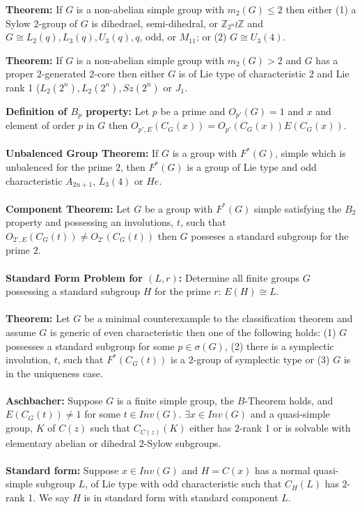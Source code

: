 {\bf Theorem:} If $G$ is a non-abelian simple group with $m_2(G) \le 2$ then either
(1) a Sylow $2$-group of $G$ is dihedrael, semi-dihedral, or
${\mathbb Z}_{2^n} \wr {\mathbb Z}$ and $G \cong L_2(q), L_3(q), U_3(q), q$, odd, or
$M_{11}$; or (2) $G \cong U_3(4)$.
\begin{quote}
\end{quote}
{\bf Theorem:} If $G$ is a non-abelian simple group with $m_2(G) > 2$  and
$G$ has a proper $2$-generated $2$-core then either $G$ is of Lie type of characteristic 2
and Lie rank 1 ($L_2(2^n), L_2(2^n), Sz(2^n)$ or $J_1$.
\begin{quote}
\end{quote}
{\bf Definition of $B_p$ property:}   Let $p$ be a prime and $O_{p'}(G)=1$ and $x$ and element of
order $p$ in $G$ then $O_{p',E}(C_G(x))= O_{p'}(C_G(x))E(C_G(x))$.
\\
\\
{\bf Unbalenced Group Theorem:} If $G$ is a group with $F^*(G)$, simple which is unbalenced for
the prime $2$, then $F^*(G)$ is a group of Lie type and odd characteristic $A_{2n+1}$, 
$L_3(4)$ or $He$.
\\
\\
{\bf Component Theorem:} Let $G$ be a group with $F^*(G)$ simple satisfying the $B_2$ property
and possessing an involutions, $t$, such that $O_{2',E}(C_G(t)) \ne O_{2'}(C_G(t))$ then
$G$ posseses a standard subgroup for the prime $2$.
\\
\\
{\bf Standard Form Problem for $(L,r)$:}   Determine all finite groups $G$ possessing a 
standard subgroup $H$ for the prime $r$: $E(H) \cong L$.
\\
\\
{\bf Theorem:} Let $G$ be a minimal counterexample to the classification theorem and assume $G$
is generic of even characteristic then one of the following holds:
(1) $G$ possesses a standard subgroup  for some $p \in \sigma(G)$,
(2) there is a symplectic involution, $t$, such that $F^*(C_G(t))$ is a $2$-group
of symplectic type or 
(3) $G$ is in the uniqueness case.
\\
\\
{\bf Aschbacher:} Suppose $G$ is a finite simple group, the $B$-Theorem holds, and $E(C_G(t)) \neq 1$
for some $t \in Inv(G)$.  $\exists x \in Inv(G)$ and a quasi-simple group,
$K$ of $C(z)$ such that $C_{C(z)}(K)$ either has $2$-rank 1 or is solvable with elementary abelian
or dihedral $2$-Sylow subgroups.
\\
\\
{\bf Standard form:} Suppose $x \in Inv(G)$ and  $H = C(x)$ has a normal quasi-simple subgroup $L$,
of Lie type with odd characteristic such that $C_H(L)$ has $2$-rank 1.   We say $H$ is in standard
form with standard component $L$.
